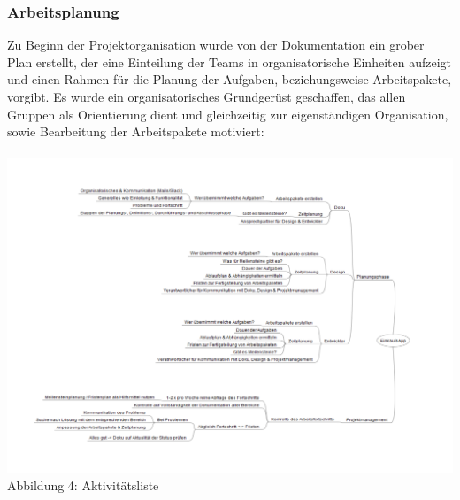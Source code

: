 \documentclass[12pt,a4paper]{article}
\begin{document}
\subsubsection{Arbeitsplanung}
Zu Beginn der Projektorganisation wurde von der Dokumentation ein grober Plan erstellt, der eine Einteilung der Teams in organisatorische Einheiten aufzeigt und einen Rahmen für die Planung der Aufgaben, beziehungsweise Arbeitspakete, vorgibt. 
Es wurde ein organisatorisches Grundgerüst geschaffen, das allen Gruppen als Orientierung dient und gleichzeitig zur eigenständigen Organisation, sowie Bearbeitung der Arbeitspakete motiviert:
\\
\\
\hspace*{-10mm} \includegraphics[trim = 20mm 0mm 0mm 20mm,clip,scale=0.7]{Aktivitaetsliste.pdf}
\\
\footnotesize Abbildung 4: Aktivitätsliste
\normalsize
\\
\linebreak
\end{document}
